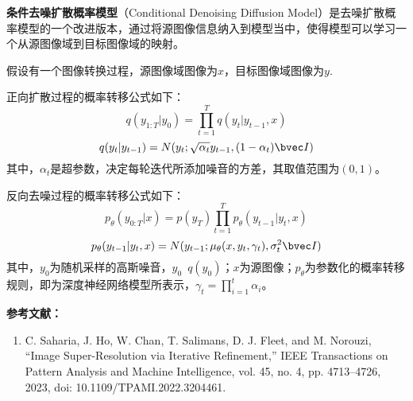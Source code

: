 
\textbf{条件去噪扩散概率模型}（Conditional Denoising Diffusion Model）是去噪扩散概率模型的一个改进版本，通过将源图像信息纳入到模型当中，使得模型可以学习一个从源图像域到目标图像域的映射。

假设有一个图像转换过程，源图像域图像为$x$，目标图像域图像为$y$.

正向扩散过程的概率转移公式如下：
\begin{equation}
q({y_{1:T}}|{y_0}) = \prod\limits_{t = 1}^T {q({y_t}|{y_{t - 1},x})}
\end{equation}
\begin{equation}
q({y_t}|{y_{t - 1}}) = {N}({y_t};\sqrt {\alpha_t} {y_{t - 1}},(1-\alpha_t) \bvec I)
\end{equation}
其中，$\alpha_t$是超参数，决定每轮迭代所添加噪音的方差，其取值范围为$(0,1)$。


反向去噪过程的概率转移公式如下：
\begin{equation}
{p_\theta }({y_{0:T}|x}) = p({y_T})\prod\limits_{t = 1}^T {{p_\theta }({y_{t - 1}}|{y_t,x})}
\end{equation}
\begin{equation}
{p_\theta }({y_{t - 1}}|{y_t,x}) = N({y_{t - 1}};{\mu _\theta }({x,y_t,\gamma_t}),\sigma_t^2 \bvec I)
\end{equation}
其中，$y_0$为随机采样的高斯噪音，$y_0$~$q(y_0)$；$x$为源图像；$p_\theta$为参数化的概率转移规则，即为深度神经网络模型所表示，$\gamma_t=\prod\limits_{i=1}^t\alpha_i$。


\textbf{参考文献：}
\begin{enumerate}
\item C. Saharia, J. Ho, W. Chan, T. Salimans, D. J. Fleet, and M. Norouzi, “Image Super-Resolution via Iterative Refinement,” IEEE Transactions on Pattern Analysis and Machine Intelligence, vol. 45, no. 4, pp. 4713–4726, 2023, doi: 10.1109/TPAMI.2022.3204461.
\end{enumerate}